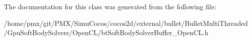 The documentation for this class was generated from the following file\+:\begin{DoxyCompactItemize}
\item 
/home/pmx/git/\+P\+M\+X/\+Simu\+Cocos/cocos2d/external/bullet/\+Bullet\+Multi\+Threaded/\+Gpu\+Soft\+Body\+Solvers/\+Open\+C\+L/bt\+Soft\+Body\+Solver\+Buffer\+\_\+\+Open\+C\+L.\+h\end{DoxyCompactItemize}
